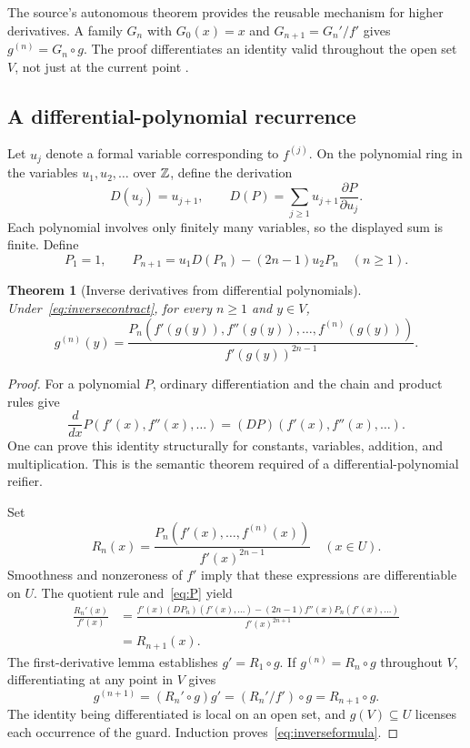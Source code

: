\documentclass[11pt,a4paper]{article}
\newtheorem{theorem}{Theorem}[section]
\theoremstyle{definition}\newtheorem{definition}[theorem]{Definition}
\theoremstyle{remark}\newtheorem{remark}[theorem]{Remark}
\begin{document}
The source's autonomous theorem provides the reusable mechanism for higher derivatives. A family $G_n$ with $G_0(x)=x$ and $G_{n+1}=G_n'/f'$ gives $g^{(n)}=G_n\circ g$. The proof differentiates an identity valid throughout the open set $V$, not just at the current point \cite{ode,inverse}.

\subsection{A differential-polynomial recurrence}
Let $u_j$ denote a formal variable corresponding to $f^{(j)}$. On the polynomial ring in the variables $u_1,u_2,\ldots$ over $\mathbb Z$, define the derivation
\[
 D(u_j)=u_{j+1},\qquad
 D(P)=\sum_{j\ge1}u_{j+1}\frac{\partial P}{\partial u_j}.
\]
Each polynomial involves only finitely many variables, so the displayed sum is finite. Define
\begin{equation}\label{eq:P}
 P_1=1,\qquad
 P_{n+1}=u_1D(P_n)-(2n-1)u_2P_n\quad(n\ge1).
\end{equation}

\begin{theorem}[Inverse derivatives from differential polynomials]\label{thm:inversepoly}
Under~\eqref{eq:inversecontract}, for every $n\ge1$ and $y\in V$,
\begin{equation}\label{eq:inverseformula}
 g^{(n)}(y)=
 \frac{P_n(f'(g(y)),f''(g(y)),\ldots,f^{(n)}(g(y)))}
      {f'(g(y))^{2n-1}}.
\end{equation}
\end{theorem}
\begin{proof}
For a polynomial $P$, ordinary differentiation and the chain and product rules give
\[
 \frac{d}{dx}P(f'(x),f''(x),\ldots)
       =(DP)(f'(x),f''(x),\ldots).
\]
One can prove this identity structurally for constants, variables, addition, and multiplication. This is the semantic theorem required of a differential-polynomial reifier.

Set
\[
 R_n(x)=\frac{P_n(f'(x),\ldots,f^{(n)}(x))}{f'(x)^{2n-1}}
 \quad(x\in U).
\]
Smoothness and nonzeroness of $f'$ imply that these expressions are differentiable on $U$. The quotient rule and~\eqref{eq:P} yield
\begin{align*}
 \frac{R_n'(x)}{f'(x)}
 &=\frac{f'(x)(DP_n)(f'(x),\ldots)
       -(2n-1)f''(x)P_n(f'(x),\ldots)}{f'(x)^{2n+1}}\\
 &=R_{n+1}(x).
\end{align*}
The first-derivative lemma establishes $g'=R_1\circ g$. If $g^{(n)}=R_n\circ g$ throughout $V$, differentiating at any point in $V$ gives
\[
 g^{(n+1)}=(R_n'\circ g)g'
           =(R_n'/f')\circ g=R_{n+1}\circ g.
\]
The identity being differentiated is local on an open set, and $g(V)\subseteq U$ licenses each occurrence of the guard. Induction proves~\eqref{eq:inverseformula}.
\end{proof}
\end{document}
